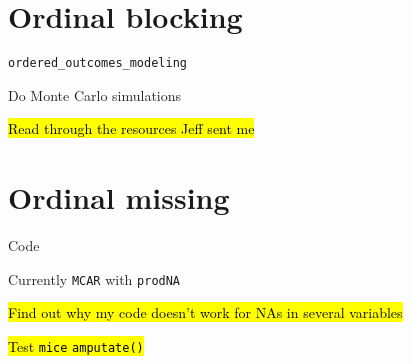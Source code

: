 \section*{Ordinal blocking}
	\begin{coi}
		\item \texttt{ordered\_outcomes\_modeling}
			\begin{coi}
				\item Do Monte Carlo simulations
					\begin{coi}
						\item \hl{Read through the resources Jeff sent me}
					\end{coi}
			\end{coi}
	\end{coi}
	
\section*{Ordinal missing}
	\begin{coi}
		\item Code
			\begin{coi}
				\item Currently \texttt{MCAR} with \texttt{prodNA}
					\begin{coi}
						\item \hl{Find out why my code doesn't work for NAs in several variables}
					\end{coi}
				\item \hl{Test \texttt{mice} \texttt{amputate()}}
			\end{coi}
	\end{coi}


	


	




